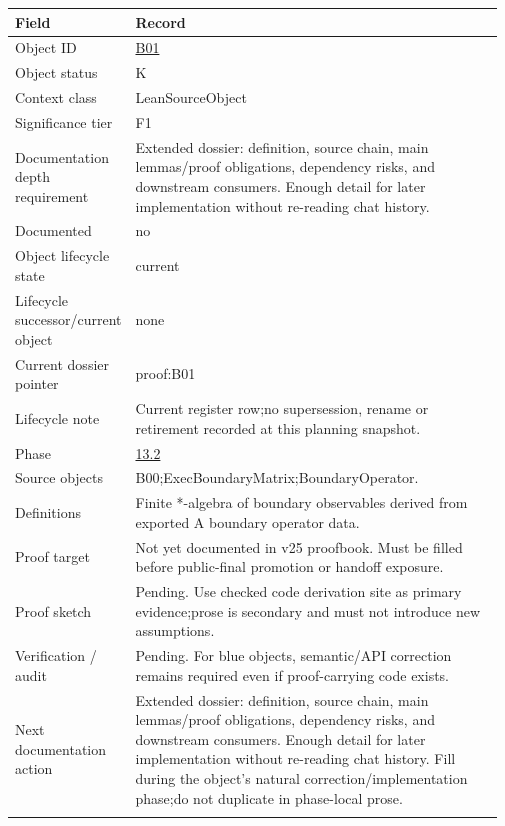 \begin{longtable}{L{0.16\linewidth} L{0.81\linewidth}}
\hline
\textbf{Field} & \textbf{Record}\\
\hline
Object ID & \hyperlink{object-row-B01}{B01}\\
\hline\addlinespace[0.20em]
Object status & K\\
\hline\addlinespace[0.20em]
Context class & LeanSourceObject\\
\hline\addlinespace[0.20em]
Significance tier & F1\\
\hline\addlinespace[0.20em]
Documentation depth requirement & Extended dossier: definition, source chain, main lemmas/\allowbreak{}proof obligations, dependency risks, and downstream consumers. Enough detail for later implementation without re-reading chat history.\\
\hline\addlinespace[0.20em]
Documented & no\\
\hline\addlinespace[0.20em]
Object lifecycle state & current\\
\hline\addlinespace[0.20em]
Lifecycle successor/\allowbreak{}current object & none\\
\hline\addlinespace[0.20em]
Current dossier pointer & proof:B01\\
\hline\addlinespace[0.20em]
Lifecycle note & Current register row;\newline no supersession, rename or retirement recorded at this planning snapshot.\\
\hline\addlinespace[0.20em]
Phase & \hyperlink{phase-row-13-2}{13.2}\\
\hline\addlinespace[0.20em]
Source objects & B00;\newline ExecBoundaryMatrix;\newline BoundaryOperator.\\
\hline\addlinespace[0.20em]
Definitions & Finite *-algebra of boundary observables derived from exported A boundary operator data.\\
\hline\addlinespace[0.20em]
Proof target & Not yet documented in v25 proofbook. Must be filled before public-final promotion or handoff exposure.\\
\hline\addlinespace[0.20em]
Proof sketch & Pending. Use checked code derivation site as primary evidence;\newline prose is secondary and must not introduce new assumptions.\\
\hline\addlinespace[0.20em]
Verification /\allowbreak{} audit & Pending. For blue objects, semantic/\allowbreak{}API correction remains required even if proof-carrying code exists.\\
\hline\addlinespace[0.20em]
Next documentation action & Extended dossier: definition, source chain, main lemmas/\allowbreak{}proof obligations, dependency risks, and downstream consumers. Enough detail for later implementation without re-reading chat history. Fill during the object's natural correction/\allowbreak{}implementation phase;\newline do not duplicate in phase-local prose.\\
\hline\addlinespace[0.20em]
\end{longtable}
